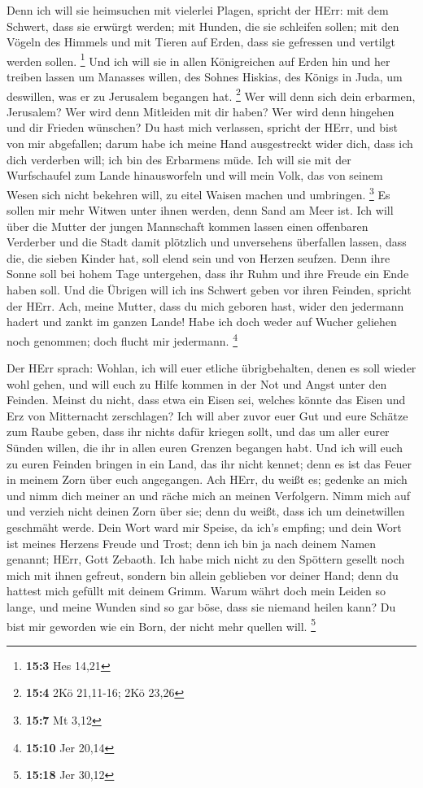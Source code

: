  Denn ich will sie heimsuchen mit vielerlei Plagen, spricht
der HErr: mit dem Schwert, dass sie erwürgt werden; mit Hunden, die sie
schleifen sollen; mit den Vögeln des Himmels und mit Tieren auf Erden,
dass sie gefressen und vertilgt werden sollen. \footnote{\textbf{15:3}
  Hes 14,21}  Und ich will sie in allen Königreichen auf
Erden hin und her treiben lassen um Manasses willen, des Sohnes Hiskias,
des Königs in Juda, um deswillen, was er zu Jerusalem begangen hat.
\footnote{\textbf{15:4} 2Kö 21,11-16; 2Kö 23,26}  Wer will
denn sich dein erbarmen, Jerusalem? Wer wird denn Mitleiden mit dir
haben? Wer wird denn hingehen und dir Frieden wünschen?  Du
hast mich verlassen, spricht der HErr, und bist von mir abgefallen;
darum habe ich meine Hand ausgestreckt wider dich, dass ich dich
verderben will; ich bin des Erbarmens müde.  Ich will sie
mit der Wurfschaufel zum Lande hinausworfeln und will mein Volk, das von
seinem Wesen sich nicht bekehren will, zu eitel Waisen machen und
umbringen. \footnote{\textbf{15:7} Mt 3,12}  Es sollen mir
mehr Witwen unter ihnen werden, denn Sand am Meer ist. Ich will über die
Mutter der jungen Mannschaft kommen lassen einen offenbaren Verderber
und die Stadt damit plötzlich und unversehens überfallen lassen,
 dass die, die sieben Kinder hat, soll elend sein und von
Herzen seufzen. Denn ihre Sonne soll bei hohem Tage untergehen, dass ihr
Ruhm und ihre Freude ein Ende haben soll. Und die Übrigen will ich ins
Schwert geben vor ihren Feinden, spricht der HErr.  Ach,
meine Mutter, dass du mich geboren hast, wider den jedermann hadert und
zankt im ganzen Lande! Habe ich doch weder auf Wucher geliehen noch
genommen; doch flucht mir jedermann. \footnote{\textbf{15:10} Jer 20,14}

 Der HErr sprach: Wohlan, ich will euer etliche
übrigbehalten, denen es soll wieder wohl gehen, und will euch zu Hilfe
kommen in der Not und Angst unter den Feinden.  Meinst du
nicht, dass etwa ein Eisen sei, welches könnte das Eisen und Erz von
Mitternacht zerschlagen?  Ich will aber zuvor euer Gut und
eure Schätze zum Raube geben, dass ihr nichts dafür kriegen sollt, und
das um aller eurer Sünden willen, die ihr in allen euren Grenzen
begangen habt.  Und ich will euch zu euren Feinden bringen
in ein Land, das ihr nicht kennet; denn es ist das Feuer in meinem Zorn
über euch angegangen.  Ach HErr, du weißt es; gedenke an
mich und nimm dich meiner an und räche mich an meinen Verfolgern. Nimm
mich auf und verzieh nicht deinen Zorn über sie; denn du weißt, dass ich
um deinetwillen geschmäht werde.  Dein Wort ward mir
Speise, da ich's empfing; und dein Wort ist meines Herzens Freude und
Trost; denn ich bin ja nach deinem Namen genannt; HErr, Gott Zebaoth.
 Ich habe mich nicht zu den Spöttern gesellt noch mich mit
ihnen gefreut, sondern bin allein geblieben vor deiner Hand; denn du
hattest mich gefüllt mit deinem Grimm.  Warum währt doch
mein Leiden so lange, und meine Wunden sind so gar böse, dass sie
niemand heilen kann? Du bist mir geworden wie ein Born, der nicht mehr
quellen will. \footnote{\textbf{15:18} Jer 30,12}

